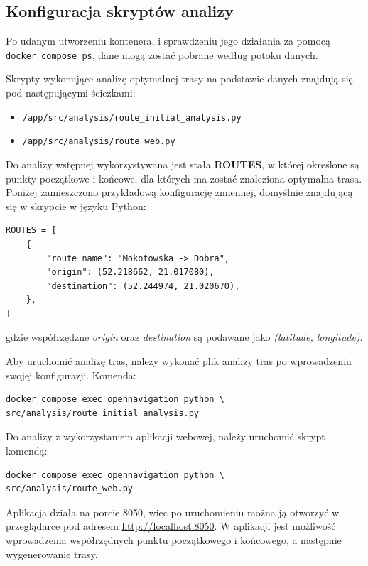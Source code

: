 \documentclass[12pt]{article}
\begin{document}
\subsection{Konfiguracja skryptów analizy}

Po udanym utworzeniu kontenera, i sprawdzeniu jego działania za pomocą \verb|docker compose ps|, dane 
mogą zostać pobrane według potoku danych.

Skrypty wykonujące analizę optymalnej trasy na podstawie danych znajdują się pod następującymi ścieżkami:
\begin{itemize}
\item \verb|/app/src/analysis/route_initial_analysis.py|
\item \verb|/app/src/analysis/route_web.py|
\end{itemize}



Do analizy wstępnej wykorzystywana jest stała \textbf{ROUTES}, w której określone są punkty 
początkowe i końcowe, dla których ma zostać znaleziona optymalna trasa.
Poniżej zamieszczono przykładową konfigurację zmiennej, domyślnie znajdującą się w skrypcie w języku Python:

\begin{tcolorbox}
    \begin{verbatim}
ROUTES = [
    {
        "route_name": "Mokotowska -> Dobra",
        "origin": (52.218662, 21.017080),
        "destination": (52.244974, 21.020670),
    },
]
    \end{verbatim}
\end{tcolorbox} 
gdzie współrzędzne \textit{origin} oraz \textit{destination} są podawane jako \textit{(latitude, longitude)}.

Aby uruchomić analizę tras, należy wykonać plik analizy tras po wprowadzeniu swojej konfigurazji. Komenda:
\begin{tcolorbox}
    \begin{verbatim}
docker compose exec opennavigation python \
src/analysis/route_initial_analysis.py
    \end{verbatim}
\end{tcolorbox} 


Do analizy z wykorzystaniem aplikacji webowej, należy uruchomić skrypt komendą:

\begin{tcolorbox}
\begin{verbatim}
docker compose exec opennavigation python \
src/analysis/route_web.py
\end{verbatim}
\end{tcolorbox}
Aplikacja działa na porcie 8050, więc po uruchomieniu można ją otworzyć w przeglądarce pod adresem \url{http://localhost:8050}.
W aplikacji jest możliwość wprowadzenia współrzędnych punktu początkowego i końcowego, a następnie wygenerowanie trasy.
\end{document}
